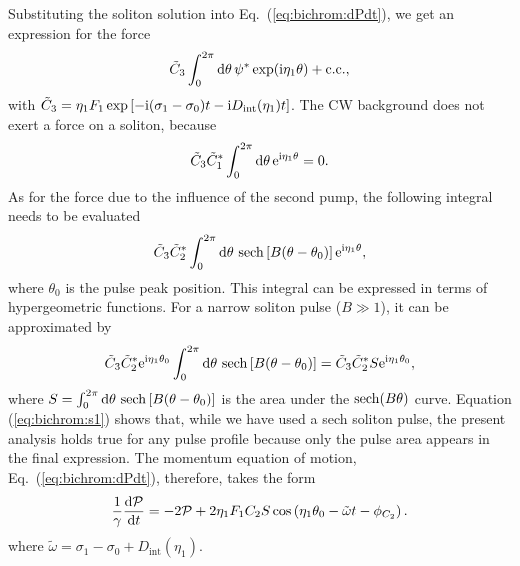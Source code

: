 Substituting the soliton solution into Eq.~(\ref{eq:bichrom:dPdt}), we get an expression for the force
%
\begin{equation}\label{eq:bichrom:Pforce}
\tilde{C}_3 \int_{0}^{2\pi} \mathrm{d} \theta \, \psi^* \exp(\mathrm{i} \eta_1 \theta) + \mathrm{c.c.},
\end{equation}
%
with $\tilde{C}_3 = \eta_1 F_1 \exp \left[ - \mathrm{i} (\sigma_1 - \sigma_0) t - \mathrm{i} D_\mathrm{int} (\eta_1) t \right]$. The CW background does not exert a force on a soliton, because
%
\begin{equation}
\tilde{C}_3 \tilde{C}_1^* \int_{0}^{2\pi} \mathrm{d} \theta \, \mathrm{e}^{\mathrm{i} \eta_1 \theta} = 0.
\end{equation}
%
As for the force due to the influence of the second pump, the following integral needs to be evaluated
%
\begin{equation}
\tilde{C}_3 \tilde{C}_2^* \int_{0}^{2\pi} \mathrm{d} \theta \, \operatorname{sech} \left[ B(\theta - \theta_0) \right] \mathrm{e}^{\mathrm{i} \eta_1 \theta},
\end{equation}
%
where $\theta_0$ is the pulse peak position. This integral can be expressed in terms of hypergeometric functions. For a narrow soliton pulse ($B \gg 1$), it can be approximated by
%
\begin{equation}\label{eq:bichrom:s1}
\tilde{C}_3 \tilde{C}_2^* \mathrm{e}^{\mathrm{i} \eta_1 \theta_0} \int_{0}^{2\pi} \mathrm{d} \theta \, \operatorname{sech} \left[ B(\theta - \theta_0) \right] = \tilde{C}_3 \tilde{C}_2^* S \mathrm{e}^{\mathrm{i} \eta_1 \theta_0},
\end{equation}
%
where $S = \int_{0}^{2\pi} \mathrm{d} \theta \, \operatorname{sech} \left[ B(\theta - \theta_0) \right]$ is the area under the $\operatorname{sech}(B \theta )$ curve. Equation (\ref{eq:bichrom:s1}) shows that, while we have used a sech soliton pulse, the present analysis holds true for any pulse profile because only the pulse area appears in the final expression. The momentum equation of motion, Eq.~(\ref{eq:bichrom:dPdt}), therefore, takes the form
%
\begin{equation}\label{eq:bichrom:dPdtComplete}
\frac{1}{\gamma} \frac{\mathrm{d}\mathcal{P}}{\mathrm{d}t} = -2 \mathcal{P} + 2 \eta_1 F_1 C_2 S \cos \left( \eta_1 \theta_0 - \tilde{\omega} t - \phi_{C_2} \right).
\end{equation}
%
where $\tilde{\omega} =  \sigma_1 - \sigma_0 + D_\mathrm{int}(\eta_1)$.

